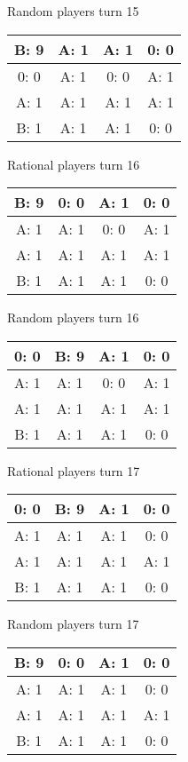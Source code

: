 \documentclass[12pt]{article}
\begin{document}
Random players turn 15
\begin{center}
\begin{tabular}{|c|c|c|c|} 
\hline
B: 9  & A: 1  & A: 1  & 0: 0  \\ \hline
0: 0  & A: 1  & 0: 0  & A: 1  \\ \hline
A: 1  & A: 1  & A: 1  & A: 1  \\ \hline
B: 1  & A: 1  & A: 1  & 0: 0  \\ \hline
\end{tabular} 
\end{center}

Rational players turn 16
\begin{center}
\begin{tabular}{|c|c|c|c|} 
\hline
B: 9  & 0: 0  & A: 1  & 0: 0  \\ \hline
A: 1  & A: 1  & 0: 0  & A: 1  \\ \hline
A: 1  & A: 1  & A: 1  & A: 1  \\ \hline
B: 1  & A: 1  & A: 1  & 0: 0  \\ \hline
\end{tabular} 
\end{center}
Random players turn 16
\begin{center}
\begin{tabular}{|c|c|c|c|} 
\hline
0: 0  & B: 9  & A: 1  & 0: 0  \\ \hline
A: 1  & A: 1  & 0: 0  & A: 1  \\ \hline
A: 1  & A: 1  & A: 1  & A: 1  \\ \hline
B: 1  & A: 1  & A: 1  & 0: 0  \\ \hline
\end{tabular} 
\end{center}

Rational players turn 17
\begin{center}
\begin{tabular}{|c|c|c|c|} 
\hline
0: 0  & B: 9  & A: 1  & 0: 0  \\ \hline
A: 1  & A: 1  & A: 1  & 0: 0  \\ \hline
A: 1  & A: 1  & A: 1  & A: 1  \\ \hline
B: 1  & A: 1  & A: 1  & 0: 0  \\ \hline
\end{tabular} 
\end{center}
Random players turn 17
\begin{center}
\begin{tabular}{|c|c|c|c|} 
\hline
B: 9  & 0: 0  & A: 1  & 0: 0  \\ \hline
A: 1  & A: 1  & A: 1  & 0: 0  \\ \hline
A: 1  & A: 1  & A: 1  & A: 1  \\ \hline
B: 1  & A: 1  & A: 1  & 0: 0  \\ \hline
\end{tabular} 
\end{center}
\end{document}
